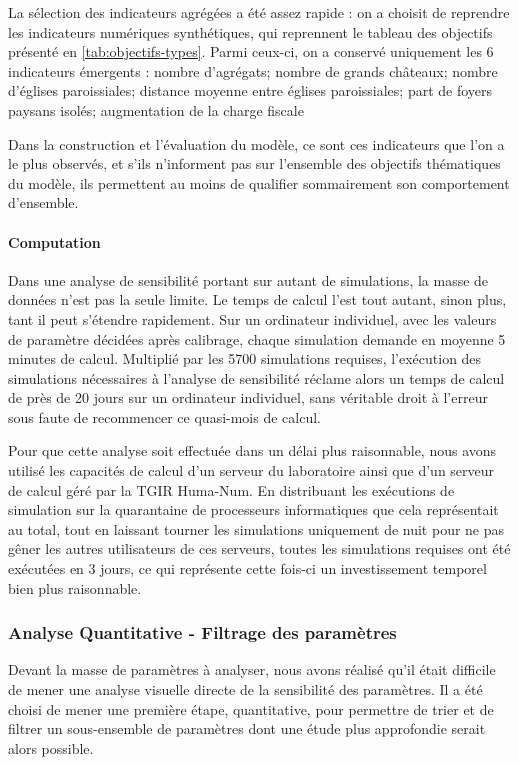 La sélection des indicateurs agrégées a été assez rapide : on a choisit de reprendre les indicateurs numériques synthétiques, qui reprennent le tableau des objectifs présenté en \cref{tab:objectifs-types}.
Parmi ceux-ci, on a conservé uniquement les 6 indicateurs \og émergents\fg{} : 
nombre d'agrégats; nombre de grands châteaux; nombre d'églises paroissiales; distance moyenne entre églises paroissiales; part de foyers paysans isolés; augmentation de la charge fiscale
	
Dans la construction et l'évaluation du modèle, ce sont ces indicateurs que l'on a le plus observés, et s'ils n'informent pas sur l'ensemble des objectifs thématiques du modèle, ils permettent au moins de qualifier sommairement son comportement d'ensemble.

\paragraph{Computation}

Dans une analyse de sensibilité portant sur autant de simulations, la masse de données n'est pas la seule limite.
Le temps de calcul l'est tout autant, sinon plus, tant il peut s'étendre rapidement.
Sur un ordinateur individuel, avec les valeurs de paramètre décidées après calibrage, chaque simulation demande en moyenne 5 minutes de calcul.
Multiplié par les 5700 simulations requises, l'exécution des simulations nécessaires à l'analyse de sensibilité réclame alors un temps de calcul de près de 20 jours sur un ordinateur individuel, sans véritable droit à l'erreur sous faute de recommencer ce quasi-mois de calcul.

Pour que cette analyse soit effectuée dans un délai plus raisonnable, nous avons utilisé les capacités de calcul d'un serveur du laboratoire ainsi que d'un serveur de calcul géré par la TGIR Huma-Num.
En distribuant les exécutions de simulation sur la quarantaine de processeurs informatiques que cela représentait au total, tout en laissant tourner les simulations uniquement de nuit pour ne pas gêner les autres utilisateurs de ces serveurs, toutes les simulations requises ont été exécutées en 3 jours, ce qui représente cette fois-ci un investissement temporel bien plus raisonnable.

\subsubsection{Analyse Quantitative - Filtrage des paramètres}

Devant la masse de paramètres à analyser, nous avons réalisé qu'il était difficile de mener une analyse visuelle directe de la sensibilité des paramètres.
Il a été choisi de mener une première étape, quantitative, pour permettre de trier et de filtrer un sous-ensemble de paramètres dont une étude plus approfondie serait alors possible.


